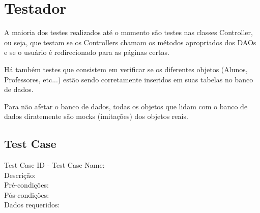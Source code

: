 \documentclass[12pt,letterpaper]{article}
\begin{document}





\pagebreak
\section{Testador}

A maioria dos testes realizados até o momento são testes nas classes Controller, ou seja, que testam se os Controllers chamam os métodos apropriados dos DAOs e se o usuário é redirecionado para as páginas certas. 

Há também testes que consistem em verificar se os diferentes objetos (Alunos, Professores, etc...) estão sendo corretamente inseridos em suas tabelas no banco de dados.

Para não afetar o banco de dados, todas os objetos que lidam com o banco de dados diratemente são mocks (imitações) dos objetos reais.

\subsection{Test Case}


\noindent Test Case ID - Test Case Name:\\
Descrição:\\ %
Pré-condições:\\ %
Pós-condições:\\ %
Dados requeridos:\\ %
\end{document}
